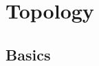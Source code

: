 \documentclass{article}
\begin{document}
%
%
%


\section{Topology}

\subsection{Basics}
\end{document}
